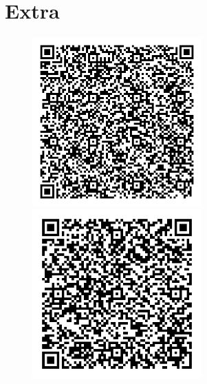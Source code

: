 \documentclass[12pt]{article}
\begin{document}
\pagebreak

\section{Extra}

\begin{figure}[h]
    \centering
    \includegraphics[width=65mm]{imagens/pablo.jpg}
    \includegraphics[width=65mm]{imagens/marco.jpg}
\end{figure}
\end{document}
